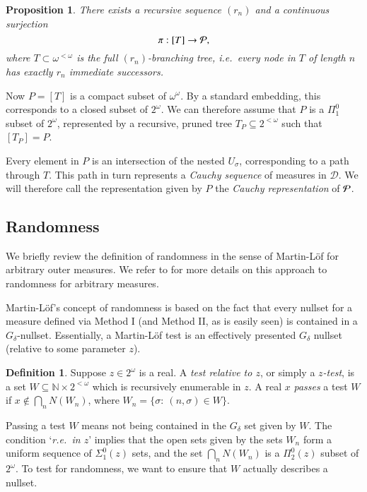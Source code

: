 \documentclass[11pt,reqno]{article}
\theoremstyle{plain}
\newtheorem{prop}{Proposition}
\theoremstyle{definition}
\newtheorem{defn}{Definition}
\theoremstyle{remark}
\numberwithin{equation}{section}
\newcommand{\Nat}{\ensuremath{\mathbb{N}}}
\newcommand{\Cant}{\ensuremath{2^{\omega}}}
\newcommand{\Baire}{\ensuremath{\omega^{\omega}}}
\newcommand{\Str}[1][<\omega]{\ensuremath{2^{#1}}}
\newcommand{\Nstr}[1][<\omega]{\ensuremath{\omega^{#1}}}
\newcommand{\Acyl}[1]{\ensuremath{N(#1)}}
\newcommand{\Pmeas}{\ensuremath{\CMcal{P}}}
\begin{document}
\begin{prop}
	There exists a recursive sequence $(r_n)$ and a continuous surjection
	\[
		\pi: [T] \to \Pmeas,
	\]
	where $T \subset \Nstr$ is the full $(r_n)$-branching tree, i.e.\ every node in $T$ of length $n$ has exactly $r_n$ immediate successors.
\end{prop}

Now $P = [T]$ is a compact subset of $\Baire$. By a standard embedding, this corresponds to a closed subset of $\Cant$. We can therefore assume that $P$ is a $\Pi^0_1$ subset of $\Cant$, represented by a recursive, pruned tree $T_P \subseteq \Str$ such that $[T_P] = P$.

Every element in $P$ is an intersection of the nested $U_\sigma$, corresponding to a path through $T$. This path in turn represents a \emph{Cauchy sequence} of measures in $\mathcal{D}$.
We will therefore call the representation given by $P$ the \emph{Cauchy representation} of $\Pmeas$. 



%
%
\subsection{Randomness} \label{ssec-randomness}

We briefly review the definition of randomness in the sense of Martin-L\"of for arbitrary outer measures. We refer to \citep{reimann:ta,reimann-slaman:tbs} for more details on this approach to randomness for arbitrary measures.

Martin-L\"of's concept of randomness is based on the fact that every nullset for a measure defined via Method I (and Method II, as is easily seen) is contained in a $G_\delta$-nullset. Essentially, a Martin-L\"of test is an effectively presented $G_\delta$ nullset (relative to some parameter $z$). 

\begin{defn} \label{def-test}
	Suppose $z \in \Cant$ is a real. A \emph{test relative to $z$}, or simply a \emph{$z$-test}, is a set $W \subseteq \Nat \times \Str$ which is recursively enumerable in $z$. A real $x$ \emph{passes} a test $W$ if $x \not\in \bigcap_n \Acyl{W_n}$, where $W_n = \{ \sigma : \: (n, \sigma) \in W \}$.
\end{defn}

Passing a test $W$ means not being contained in the $G_\delta$ set given by $W$. The condition `\emph{r.e.\ in $z$}' implies that the open sets given by the sets $W_n$ form a uniform sequence of $\Sigma^0_1(z)$ sets, and the set $\bigcap_n \Acyl{W_n}$ is a $\Pi^0_2(z)$ subset of $\Cant$. To test for randomness, we want to ensure that $W$ actually describes a nullset.
\end{document}
